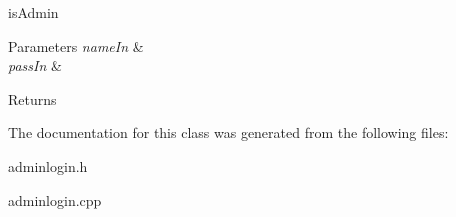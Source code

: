 is\+Admin 


\begin{DoxyParams}{Parameters}
{\em name\+In} & \\
\hline
{\em pass\+In} & \\
\hline
\end{DoxyParams}
\begin{DoxyReturn}{Returns}

\end{DoxyReturn}


The documentation for this class was generated from the following files\+:\begin{DoxyCompactItemize}
\item 
adminlogin.\+h\item 
adminlogin.\+cpp\end{DoxyCompactItemize}
